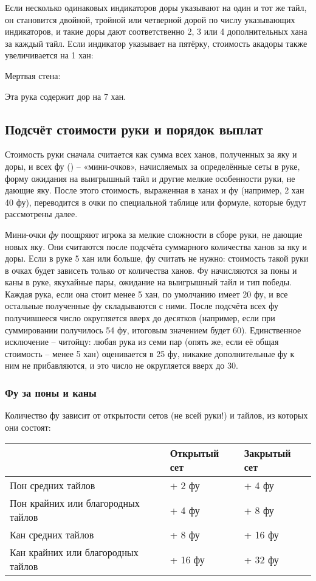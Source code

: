 Если несколько одинаковых индикаторов доры указывают на один и тот же тайл, он становится двойной, тройной или четверной дорой по числу указывающих индикаторов, и такие доры дают соответственно 2, 3 или 4 дополнительных хана за каждый тайл. Если индикатор указывает на пятёрку, стоимость акадоры также увеличивается на 1 хан:


Мертвая стена:

Эта рука содержит дор на 7 хан.

\subsection{Подсчёт стоимости руки и порядок выплат}

Стоимость руки сначала считается как сумма всех ханов, полученных за яку и доры, и всех фу () – «мини-очков», начисляемых за определённые сеты в руке, форму ожидания на выигрышный тайл и другие мелкие особенности руки, не дающие яку. После этого стоимость, выраженная в ханах и фу (например, 2 хан 40 фу), переводится в очки по специальной таблице или формуле, которые будут рассмотрены далее.

Мини-очки \textit{фу} поощряют игрока за мелкие сложности в сборе руки, не дающие новых яку. Они считаются после подсчёта суммарного количества ханов за яку и доры. Если в руке 5 хан или больше, фу считать не нужно: стоимость такой руки в очках будет зависеть только от количества ханов.
Фу начисляются за поны и каны в руке, якухайные пары, ожидание на выигрышный тайл и тип победы. Каждая рука, если она стоит менее 5 хан, по умолчанию имеет 20 фу, и все остальные полученные фу складываются с ними. После подсчёта всех фу получившееся число округляется вверх до десятков (например, если при суммировании получилось 54 фу, итоговым значением будет 60). Единственное исключение – читойцу: любая рука из семи пар (опять же, если её общая стоимость – менее 5 хан) оценивается в 25 фу, никакие дополнительные фу к ним не прибавляются, и это число не округляется вверх до 30.

\subsubsection{Фу за поны и каны}

Количество фу зависит от открытости сетов (не всей руки!) и тайлов, из которых они состоят:

\begin{tabular}{|L{7cm}|C{3cm}|C{3cm}|}
	\hline
	& Открытый сет &
	Закрытый сет \\
	\hline
	Пон средних тайлов &
	+ 2 фу &
	+ 4 фу \\
	\hline
	Пон крайних или благородных тайлов &
	+ 4 фу &
	+ 8 фу \\
	\hline
	Кан средних тайлов &
	+ 8 фу &
	+ 16 фу \\
	\hline
	Кан крайних или благородных тайлов &
	+ 16 фу &
	+ 32 фу \\
	\hline
\end{tabular}

